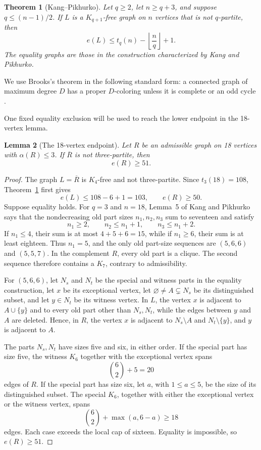 \documentclass[11pt,reqno,a4paper]{amsart}
\newtheorem{theorem}{Theorem}[section]
\newtheorem{lemma}[theorem]{Lemma}
\theoremstyle{definition}
\theoremstyle{remark}
\newcommand{\comp}[1]{\overline{#1}}
\begin{document}
\begin{theorem}[Kang--Pikhurko]\label{thm:KP}
Let $q\geq2$, let $n\geq q+3$, and suppose $q\leq(n-1)/2$.  If $L$ is a
$K_{q+1}$-free graph on $n$ vertices that is not $q$-partite, then
\begin{equation}\label{eq:KP}
  e(L)\leq t_q(n)-\left\lfloor\frac nq\right\rfloor+1.
\end{equation}
The equality graphs are those in the construction characterized by Kang and
Pikhurko.
\end{theorem}

We use Brooks's theorem in the following standard form: a connected graph of
maximum degree $D$ has a proper $D$-coloring unless it is complete or an odd
cycle \cite{Brooks1941}.

One fixed equality exclusion will be used to reach the lower endpoint in the
18-vertex lemma.

\begin{lemma}[The 18-vertex endpoint]\label{lem:endpoint18}
Let $R$ be an admissible graph on 18 vertices with $\alpha(R)\leq3$.  If
$\comp R$ is not three-partite, then
\[
  e(R)\geq51.
\]
\end{lemma}

\begin{proof}
The graph $L=\comp R$ is $K_4$-free and not three-partite.  Since
$t_3(18)=108$, Theorem~\ref{thm:KP} first gives
\[
  e(L)\leq108-6+1=103,
  \qquad e(R)\geq50.
\]
Suppose equality holds.  For $q=3$ and $n=18$, Lemma~5 of Kang and
Pikhurko says that the nondecreasing old part sizes $n_1,n_2,n_3$ sum to
seventeen and satisfy
\[
  n_1\geq2,\qquad n_2\leq n_1+1,\qquad n_3\leq n_1+2.
\]
If $n_1\leq4$, their sum is at most $4+5+6=15$, while if $n_1\geq6$,
their sum is at least eighteen.  Thus $n_1=5$, and the only old part-size
sequences are $(5,6,6)$ and $(5,5,7)$.  In the complement $R$,
every old part is a clique.  The second sequence therefore contains a
$K_7$, contrary to admissibility.

For $(5,6,6)$, let $N_s$ and $N_t$ be the special and witness parts in
the equality construction, let $x$ be its exceptional vertex, let
$\varnothing\ne A\subsetneq N_s$ be its distinguished subset, and let
$y\in N_t$ be its witness vertex.  In $L$, the vertex $x$ is adjacent to
$A\cup\{y\}$ and to every old part other than $N_s,N_t$, while the edges
between $y$ and $A$ are deleted.  Hence, in $R$, the vertex $x$ is adjacent
to $N_s\setminus A$ and $N_t\setminus\{y\}$, and $y$ is adjacent to $A$.

The parts $N_s,N_t$ have sizes five and six, in either order.  If the
special part has size five,
the witness $K_6$ together with the exceptional vertex spans
\[
  \binom62+5=20
\]
edges of $R$.  If the special part has size six, let $a$, with
$1\leq a\leq5$, be the size of its distinguished subset.  The special
$K_6$, together with either the exceptional vertex or the witness vertex,
spans
\[
  \binom62+\max(a,6-a)\geq18
\]
edges.  Each case exceeds the local cap of sixteen.  Equality is impossible,
so $e(R)\geq51$.
\end{proof}
\end{document}
